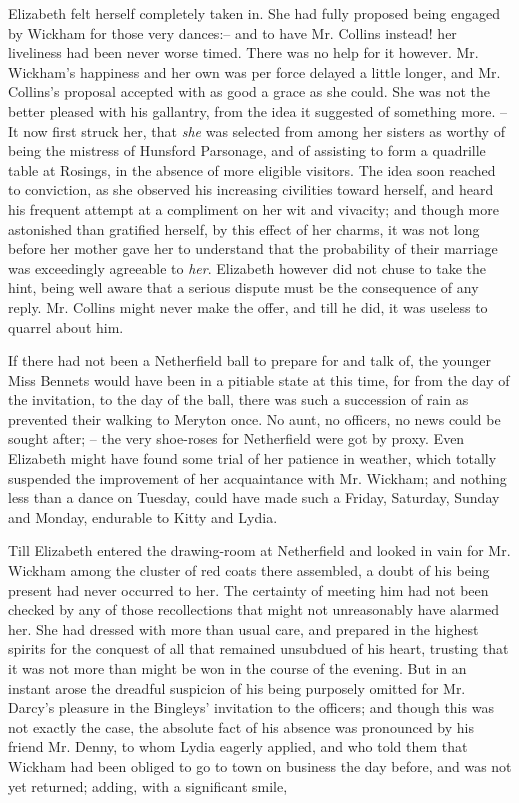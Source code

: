 Elizabeth felt herself completely taken in. She had
fully proposed being engaged by Wickham for those
very dances:-- and to have Mr. Collins instead! her liveliness
had been never worse timed. There was no help for
it however. Mr. Wickham’s happiness and her own was
per force delayed a little longer, and Mr. Collins’s proposal
accepted with as good a grace as she could. She was not
the better pleased with his gallantry, from the idea it
suggested of something more. -- It now first struck her,
that \textit{she} was selected from among her sisters as worthy
of being the mistress of Hunsford Parsonage, and of
assisting to form a quadrille table at Rosings, in the
absence of more eligible visitors. The idea soon reached
to conviction, as she observed his increasing civilities
toward herself, and heard his frequent attempt at a compliment
on her wit and vivacity; and though more astonished
than gratified herself, by this effect of her charms,
it was not long before her mother gave her to understand
that the probability of their marriage was exceedingly
agreeable to \textit{her}. Elizabeth however did not chuse to take
the hint, being well aware that a serious dispute must be
the consequence of any reply. Mr. Collins might never
make the offer, and till he did, it was useless to quarrel
about him.

If there had not been a Netherfield ball to prepare for
and talk of, the younger Miss Bennets would have been
in a pitiable state at this time, for from the day of the
invitation, to the day of the ball, there was such a succession
of rain as prevented their walking to Meryton once.
No aunt, no officers, no news could be sought after; -- the
very shoe-roses for Netherfield were got by proxy. Even
Elizabeth might have found some trial of her patience
in weather, which totally suspended the improvement of
her acquaintance with Mr. Wickham; and nothing less
than a dance on Tuesday, could have made such a Friday,
Saturday, Sunday and Monday, endurable to Kitty and
Lydia.


Till Elizabeth entered the drawing-room at Netherfield
and looked in vain for Mr. Wickham among the cluster
of red coats there assembled, a doubt of his being present
had never occurred to her. The certainty of meeting him
had not been checked by any of those recollections that
might not unreasonably have alarmed her. She had
dressed with more than usual care, and prepared in the
highest spirits for the conquest of all that remained
unsubdued of his heart, trusting that it was not more
than might be won in the course of the evening. But
in an instant arose the dreadful suspicion of his being
purposely omitted for Mr. Darcy’s pleasure in the Bingleys’
invitation to the officers; and though this was not exactly
the case, the absolute fact of his absence was pronounced
by his friend Mr. Denny, to whom Lydia eagerly applied,
and who told them that Wickham had been obliged to go
to town on business the day before, and was not yet
returned; adding, with a significant smile,

